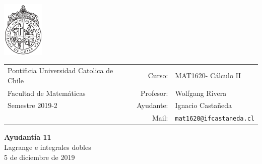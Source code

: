 \documentclass[12pt]{article}
\makeatletter
\newcommand{\ayudantia}{{\sc Ayudantía 11}}
\newcommand{\tituloayu}{Lagrange e integrales dobles}
\newcommand{\fecha}{5 de diciembre de 2019}
\newcommand{\sigla}{MAT1620}
\newcommand{\nombre}{Cálculo II}
\newcommand{\profesor}{Wolfgang Rivera}
\newcommand{\ano}{2019}
\newcommand{\semestre}{2}
\newcommand{\mail}{mat1620@ifcastaneda.cl}
\makeatother
\begin{document}
\thispagestyle{empty}

\begin{minipage}{2cm}
	\includegraphics[width=2cm]{../../../../img/logo.pdf}
	\vspace{0.5cm}
\end{minipage}
\begin{minipage}{\linewidth}
	\begin{tabular}{lrl}
		{\scriptsize\sc Pontificia Universidad Catolica de Chile} & \hspace*{0.7in}Curso: &
		\sigla  - \nombre\\
		{\sc Facultad de Matemáticas}&
		Profesor: & \profesor \\
		{\sc Semestre \ano-\semestre} & Ayudante: & {Ignacio Castañeda}\\
		& {Mail:} & \texttt{\mail}
	\end{tabular}
\end{minipage}

\vspace{-10mm}
\begin{center}
	{\LARGE\bf \ayudantia}\\
	\vspace{0.1cm}
	{\tituloayu}\\
	\vspace{0.1cm}
	\fecha\\
	\vspace{0.4cm}
\end{center}
\end{document}
